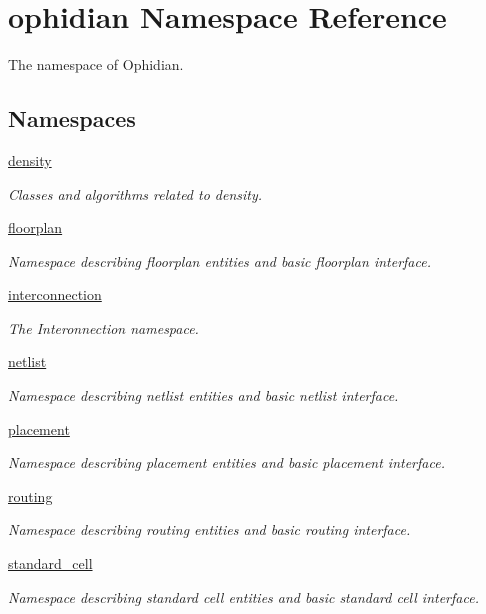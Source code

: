 \hypertarget{namespaceophidian}{\section{ophidian Namespace Reference}
\label{namespaceophidian}
}


The namespace of Ophidian.  


\subsection*{Namespaces}
\begin{DoxyCompactItemize}
\item 
\hyperlink{namespaceophidian_1_1density}{density}
\begin{DoxyCompactList}\small\item\em Classes and algorithms related to density. \end{DoxyCompactList}\item 
\hyperlink{namespaceophidian_1_1floorplan}{floorplan}
\begin{DoxyCompactList}\small\item\em Namespace describing floorplan entities and basic floorplan interface. \end{DoxyCompactList}\item 
\hyperlink{namespaceophidian_1_1interconnection}{interconnection}
\begin{DoxyCompactList}\small\item\em The Interonnection namespace. \end{DoxyCompactList}\item 
\hyperlink{namespaceophidian_1_1netlist}{netlist}
\begin{DoxyCompactList}\small\item\em Namespace describing netlist entities and basic netlist interface. \end{DoxyCompactList}\item 
\hyperlink{namespaceophidian_1_1placement}{placement}
\begin{DoxyCompactList}\small\item\em Namespace describing placement entities and basic placement interface. \end{DoxyCompactList}\item 
\hyperlink{namespaceophidian_1_1routing}{routing}
\begin{DoxyCompactList}\small\item\em Namespace describing routing entities and basic routing interface. \end{DoxyCompactList}\item 
\hyperlink{namespaceophidian_1_1standard__cell}{standard\-\_\-cell}
\begin{DoxyCompactList}\small\item\em Namespace describing standard cell entities and basic standard cell interface. \end{DoxyCompactList}\end{DoxyCompactItemize}
